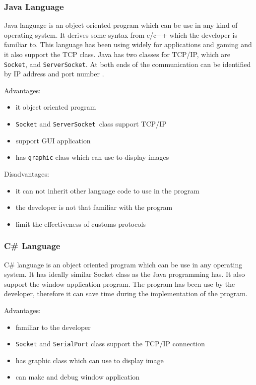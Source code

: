 \subsubsection*{Java Language}
Java language is an object oriented program which can be use in any kind of operating system.
It derives some syntax from c/c++ which the developer is familiar to. 
This language has been using widely for applications and gaming and it also support the TCP class.
Java has two classes for TCP/IP, which are \texttt{Socket}, and \texttt{ServerSocket}.
At both ends of the communication can be identified by IP address and port number \cite{kennethC}.

Advantages:
\begin{itemize}
\item it object oriented program 
\item \texttt{Socket} and \texttt{ServerSocket }class support TCP/IP
\item support GUI application
\item has \texttt{graphic} class which can use to display images
\end{itemize}

Disadvantages:
\begin{itemize}
\item it can not inherit other language code to use in the program
\item the developer is not that familiar with the program
\item limit the effectiveness of customs protocols \cite{elliotH}
\end{itemize}

\subsubsection*{C\# Language}
C\# language is an object oriented program which can be use in any operating system.
It has ideally similar Socket class as the Java programming has. 
It also support the window application program.
The program has been use by the developer, therefore it can save time during the implementation of the program.

Advantages:
\begin{itemize}
\item familiar to the developer
\item \texttt{Socket} and \texttt{SerialPort} class support the TCP/IP connection
\item has graphic class which can use to display image
\item can make and debug window application 
\end{itemize}


